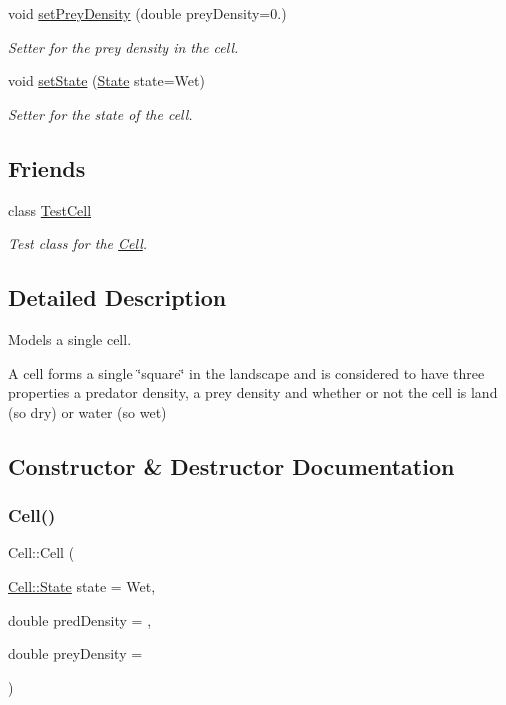 \begin{DoxyCompactItemize}
void \hyperlink{class_cell_afd3a85027b67dfd4295e2e50253c1058}{set\+Prey\+Density} (double prey\+Density=0.)
\begin{DoxyCompactList}\small\item\em Setter for the prey density in the cell. \end{DoxyCompactList}\item 
void \hyperlink{class_cell_ac388ff95a4d94da1497847ead859f258}{set\+State} (\hyperlink{class_cell_a21d74a2efcb79c93e5649b06a50b7cf5}{State} state=Wet)
\begin{DoxyCompactList}\small\item\em Setter for the state of the cell. \end{DoxyCompactList}\end{DoxyCompactItemize}
\subsection*{Friends}
\begin{DoxyCompactItemize}
\item 
class \hyperlink{class_cell_ad4ab80b1b67ca5223d4a0d2de19ba95b}{Test\+Cell}
\begin{DoxyCompactList}\small\item\em Test class for the \hyperlink{class_cell}{Cell}. \end{DoxyCompactList}\end{DoxyCompactItemize}


\subsection{Detailed Description}
Models a single cell. 

A cell forms a single \char`\"{}square\char`\"{} in the landscape and is considered to have three properties a predator density, a prey density and whether or not the cell is land (so dry) or water (so wet) 

\subsection{Constructor \& Destructor Documentation}
\mbox{\label{class_cell_afc0a4cece64b7689425fa81a4f6ef2e2}} 
\subsubsection{\texorpdfstring{Cell()}{Cell()}}
{\footnotesize\ttfamily Cell\+::\+Cell (\begin{DoxyParamCaption}\item[{\hyperlink{class_cell_a21d74a2efcb79c93e5649b06a50b7cf5}{Cell\+::\+State}}]{state = {\ttfamily Wet},  }\item[{double}]{pred\+Density = {},  }\item[{double}]{prey\+Density = {} }\end{DoxyParamCaption})}



